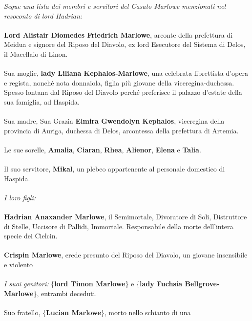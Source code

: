 \textit{Segue una lista dei membri e servitori del Casato Marlowe menzionati nel
resoconto di lord Hadrian:}
\leavevmode\\
\leavevmode\\
\phantom{123}\textbf{Lord Alistair Diomedes Friedrich Marlowe}, arconte della
prefettura di Meidua e signore del Riposo del Diavolo, ex lord Esecutore
del Sistema di Delos, il Macellaio di Linon.
\leavevmode\\
\leavevmode\\
\phantom{123}Sua moglie, \textbf{lady Liliana Kephalos-Marlowe}, una celebrata
librettista d'opera e regista, nonché nota donnaiola, figlia più giovane
della viceregina-duchessa. Spesso lontana dal Riposo del Diavolo perché
preferisce il palazzo d'estate della sua famiglia, ad Haspida.
\leavevmode\\
\leavevmode\\
\phantom{123}Sua madre, Sua Grazia \textbf{Elmira Gwendolyn Kephalos}, viceregina
della provincia di Auriga, duchessa di Delos, arcontessa della
prefettura di Artemia.
\leavevmode\\
\leavevmode\\
\phantom{123}Le sue sorelle, \textbf{Amalia}, \textbf{Ciaran}, \textbf{Rhea},
\textbf{Alienor}, \textbf{Elena} e \textbf{Talia}.
\leavevmode\\
\leavevmode\\
\phantom{123}Il suo servitore, \textbf{Mikal}, un plebeo appartenente al personale
domestico di Haspida.
\leavevmode\\
\leavevmode\\
\textit{I loro figli:}
\leavevmode\\
\leavevmode\\
\phantom{123}\textbf{Hadrian Anaxander Marlowe}, il Semimortale, Divoratore di Soli,
Distruttore di Stelle, Uccisore di Pallidi, Immortale. Responsabile
della morte dell'intera specie dei Cielcin.
\leavevmode\\
\leavevmode\\
\phantom{123}\textbf{Crispin Marlowe}, erede presunto del Riposo del Diavolo, un
giovane insensibile e violento
\leavevmode\\
\leavevmode\\
\textit{I suoi genitori: }\{\textbf{lord Timon Marlowe}\} e \{\textbf{lady
	Fuchsia Bellgrove-Marlowe}\}, entrambi deceduti.
\leavevmode\\
\leavevmode\\
\phantom{123}Suo fratello, \{\textbf{Lucian Marlowe}\}, morto nello schianto di una
